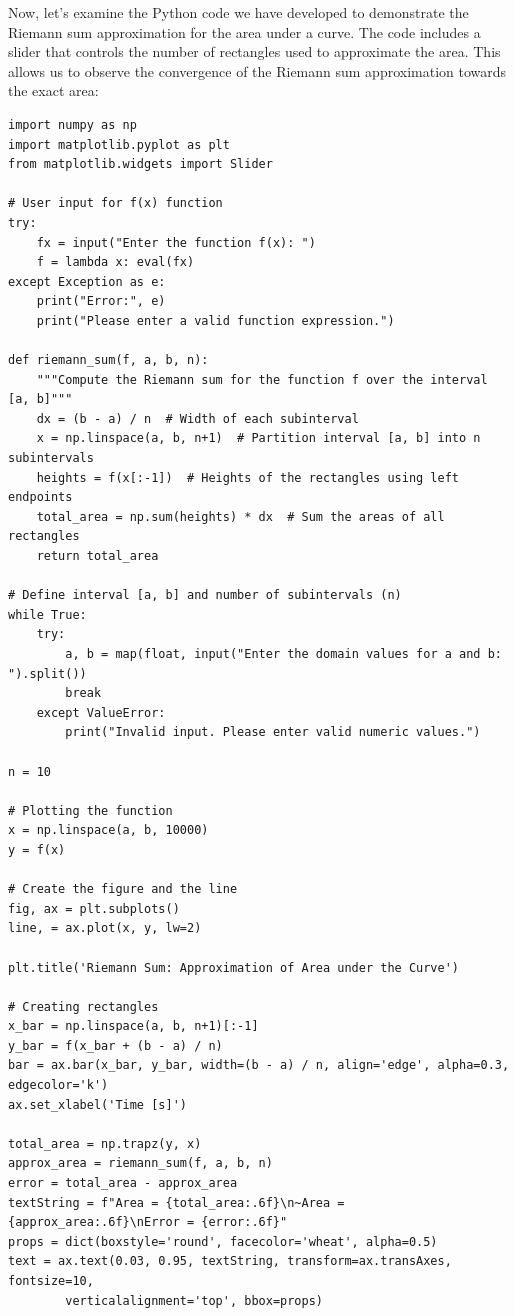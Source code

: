 \documentclass[13pt,a4paper]{report}
\begin{document}
Now, let's examine the Python code we have developed to demonstrate the Riemann sum approximation for the area under a curve. The code includes a slider that controls the number of rectangles used to approximate the area. This allows us to observe the convergence of the Riemann sum approximation towards the exact area:\\[-0.3cm]

\begin{verbatim}
import numpy as np
import matplotlib.pyplot as plt
from matplotlib.widgets import Slider

# User input for f(x) function
try:
    fx = input("Enter the function f(x): ")
    f = lambda x: eval(fx)
except Exception as e:
    print("Error:", e)
    print("Please enter a valid function expression.")

def riemann_sum(f, a, b, n):
    """Compute the Riemann sum for the function f over the interval [a, b]"""
    dx = (b - a) / n  # Width of each subinterval
    x = np.linspace(a, b, n+1)  # Partition interval [a, b] into n subintervals
    heights = f(x[:-1])  # Heights of the rectangles using left endpoints
    total_area = np.sum(heights) * dx  # Sum the areas of all rectangles
    return total_area

# Define interval [a, b] and number of subintervals (n)
while True:
    try:
        a, b = map(float, input("Enter the domain values for a and b: ").split())
        break
    except ValueError:
        print("Invalid input. Please enter valid numeric values.")
        
n = 10

# Plotting the function
x = np.linspace(a, b, 10000)
y = f(x)

# Create the figure and the line
fig, ax = plt.subplots()
line, = ax.plot(x, y, lw=2)

plt.title('Riemann Sum: Approximation of Area under the Curve')

# Creating rectangles
x_bar = np.linspace(a, b, n+1)[:-1]
y_bar = f(x_bar + (b - a) / n)
bar = ax.bar(x_bar, y_bar, width=(b - a) / n, align='edge', alpha=0.3, edgecolor='k')
ax.set_xlabel('Time [s]')

total_area = np.trapz(y, x)
approx_area = riemann_sum(f, a, b, n)
error = total_area - approx_area
textString = f"Area = {total_area:.6f}\n~Area = {approx_area:.6f}\nError = {error:.6f}"
props = dict(boxstyle='round', facecolor='wheat', alpha=0.5)
text = ax.text(0.03, 0.95, textString, transform=ax.transAxes, fontsize=10,
        verticalalignment='top', bbox=props)


\end{verbatim}
\end{document}

